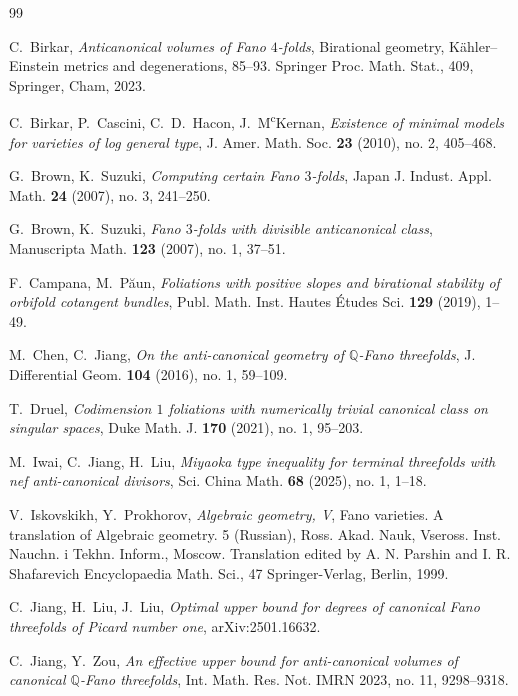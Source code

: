 \documentclass[12pt,twoside]{amsart}
\theoremstyle{definition}
\begin{document}
\begin{thebibliography}{99} 


 C.~Birkar,  
{\it Anticanonical volumes of Fano $4$-folds}, Birational geometry, K\"ahler--Einstein metrics and degenerations, 85--93.
Springer Proc. Math. Stat., 409,
Springer, Cham, 2023.


 C.~Birkar, P.~Cascini, C.~D.~Hacon, J.~M\textsuperscript{c}Kernan,
{\it Existence of minimal models for varieties of log general type},
J. Amer. Math. Soc. {\bf 23} (2010), no. 2, 405--468.



G.~Brown, K.~Suzuki, 
\emph{Computing certain Fano $3$-folds}, 
Japan J. Indust. Appl. Math. \textbf{24} (2007), no. 3, 241--250.

G.~Brown, K.~Suzuki, 
\emph{Fano $3$-folds with divisible anticanonical class}, 
Manuscripta Math. \textbf{123} (2007), no. 1, 37--51.

F.~Campana, M.~P{\u a}un, 
\emph{Foliations with positive slopes and birational stability of orbifold cotangent bundles}, 
Publ. Math. Inst. Hautes \'Etudes Sci. \textbf{129} (2019), 1--49.

 M.~Chen, C.~Jiang, {\it On the anti-canonical geometry of $\mathbb{Q}$-Fano threefolds}, 
J. Differential Geom. {\bf 104} (2016), no. 1, 59--109.

T.~Druel, 
\emph{Codimension $1$ foliations with numerically trivial canonical class on singular spaces}, 
Duke Math. J. \textbf{170} (2021), no. 1, 95--203.

M.~Iwai, C.~Jiang, H.~Liu,
 \emph{Miyaoka type inequality for terminal threefolds with nef anti-canonical divisors},
Sci. China Math. \textbf{68} (2025), no. 1, 1--18.

V.~Iskovskikh, Y.~Prokhorov,
\emph{Algebraic geometry, V},
Fano varieties. A translation of Algebraic geometry. 5 (Russian), Ross. Akad. Nauk, Vseross. Inst. Nauchn. i Tekhn. Inform., Moscow. Translation edited by A. N. Parshin and I. R. Shafarevich
Encyclopaedia Math. Sci., 47
Springer-Verlag, Berlin, 1999.

C.~Jiang, H.~Liu, J.~Liu,
\emph{Optimal upper bound for degrees of canonical Fano threefolds of Picard number one}, 
arXiv:2501.16632.

C.~Jiang, Y.~Zou,  
\emph{An effective upper bound for anti-canonical volumes of canonical $\mathbb{Q}$-Fano threefolds}, 
Int. Math. Res. Not. IMRN 2023, no. 11, 9298--9318.




\end{thebibliography}
\end{document}
